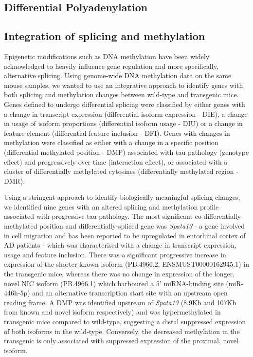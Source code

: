 \clearpage
\subsection{Differential Polyadenylation}

\clearpage
\subsection{Integration of splicing and methylation}
Epigenetic modifications such as DNA methylation have been widely acknowledged to heavily influence gene regulation and more specifically, alternative splicing. Using genome-wide DNA methylation data on the same mouse samples, we wanted to use an integrative approach to identify genes with both splicing and methylation changes between wild-type and transgenic mice. Genes defined to undergo differential splicing were classified by either genes with a change in transcript expression (differential isoform expression - DIE), a change in usage of isoform proportions (differential isoform usage - DIU) or a change in feature element (differential feature inclusion - DFI). Genes with changes in methylation were classified as either with a change in a specific position (differential methylated position - DMP) associated with tau pathology (genotype effect) and progressively over time (interaction effect), or associated with a cluster of differentially methylated cytosines (differentially methylated region - DMR). 

Using a stringent approach to identify biologically meaningful splicing changes, we identified nine genes with an altered splicing and methylation profile associated with progressive tau pathology. The most significant co-differentially-methylated position and differentially-spliced gene was \textit{Spata13} - a gene involved in cell migration\cite{Bourbia2019} and has been reported to be upregulated in entorhinal cortex of AD patients\cite{Yan2019} - which was characterised with a change in transcript expression, usage and feature inclusion. There was a significant progressive increase in expression of the shorter known isoform (PB.4966.2, ENSMUST00000162945.1) in the transgenic mice, whereas there was no change in expression of the longer, novel NIC isoform (PB.4966.1) which harboured a 5' miRNA-binding site (miR-446h-5p) and an alternative transcription start site with an upstream open reading frame. A DMP was identified upstream of \textit{Spata13} (8.9Kb and 107Kb from known and novel isoform respectively) and was hypermethylated in transgenic mice compared to wild-type, suggesting a distal suppressed expression of both isoforms in the wild-type. Conversely, the decreased methylation in the transgenic is only associated with suppressed expression of the proximal, novel isoform. 


